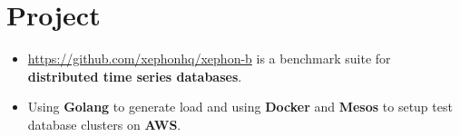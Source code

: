 \documentclass[10pt, letterpaper]{simple-cv}
\begin{document}
\section{Project}

\begin{itemize}
\item \url{https://github.com/xephonhq/xephon-b} is a benchmark suite for \textbf{distributed time series databases}.
\item Using \textbf{Golang} to generate load and using \textbf{Docker} and \textbf{Mesos} to setup test database clusters on \textbf{AWS}.
\end{itemize}

\end{document}
